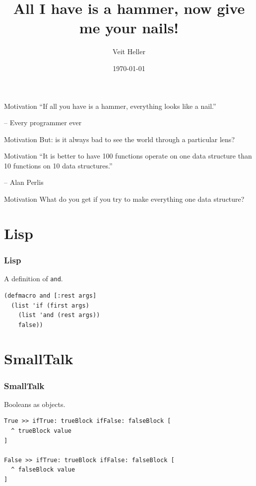 \documentclass[aspectratio=169,14pt]{beamer}
\title{All I have is a hammer, now give me your nails!}
\date{\today}
\author{Veit Heller}
\institute{EnthusiastiCon 2020}
\begin{document}
  \maketitle
  \begin{frame}{Motivation}
    “If all you have is a hammer, everything looks like a nail.”

    -- Every programmer ever
  \end{frame}
  \begin{frame}{Motivation}
    But: is it always bad to see the world through a particular lens?
  \end{frame}
  \begin{frame}{Motivation}
    “It is better to have 100 functions operate on one data structure than 10
    functions on 10 data structures.”

    -- Alan Perlis
  \end{frame}
  \begin{frame}{Motivation}
    What do you get if you try to make everything one data structure?
  \end{frame}
  \section{Lisp}
  \begin{frame}[fragile]
    \frametitle{Lisp}
    \begin{listing}[H]
      \caption{A definition of \texttt{and}.}
      \begin{verbatim}
(defmacro and [:rest args]
  (list 'if (first args)
    (list 'and (rest args))
    false))
      \end{verbatim}
    \end{listing}
  \end{frame}
  \section{SmallTalk}
  \begin{frame}[fragile]
    \frametitle{SmallTalk}
    \begin{listing}[H]
      \caption{Booleans as objects.}
      \begin{verbatim}
True >> ifTrue: trueBlock ifFalse: falseBlock [
  ^ trueBlock value
]

False >> ifTrue: trueBlock ifFalse: falseBlock [
  ^ falseBlock value
]
      \end{verbatim}
    \end{listing}
  \end{frame}
\end{document}
